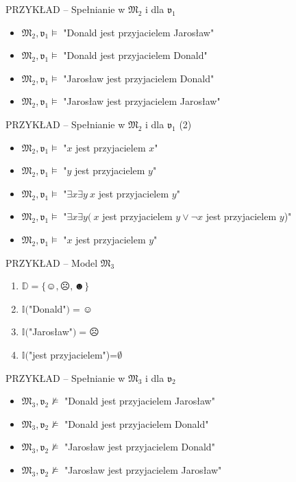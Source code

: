 \documentclass{beamer}
\begin{document}
\begin{frame}{PRZYKŁAD -- Spełnianie w $\mathfrak{M}_2$ i dla $\mathfrak{v}_1$}
%
\begin{itemize}
\item $\mathfrak{M}_2,\mathfrak{v}_1 \vDash$ "Donald jest przyjacielem Jarosław"%
\item $\mathfrak{M}_2,\mathfrak{v}_1 \vDash$ "Donald jest przyjacielem Donald"%
\item $\mathfrak{M}_2,\mathfrak{v}_1 \vDash$ "Jarosław jest przyjacielem Donald"%
\item $\mathfrak{M}_2,\mathfrak{v}_1 \vDash$ "Jarosław jest przyjacielem Jarosław"
\end{itemize}
\end{frame}

\begin{frame}{PRZYKŁAD -- Spełnianie w $\mathfrak{M}_2$ i dla $\mathfrak{v}_1$ (2)}
%
\begin{itemize}
\item $\mathfrak{M}_2,\mathfrak{v}_1 \vDash$ "$x$ jest przyjacielem $x$"%
\item $\mathfrak{M}_2,\mathfrak{v}_1 \vDash$ "$y$ jest przyjacielem $y$"%
\item $\mathfrak{M}_2,\mathfrak{v}_1 \vDash$ "$\exists x \exists y ~x$ jest przyjacielem $y$"%
\item $\mathfrak{M}_2,\mathfrak{v}_1 \vDash$ "$\exists x \exists y ( ~x$ jest przyjacielem $y \lor \neg x$ jest przyjacielem $y$)"%
\item $\mathfrak{M}_2,\mathfrak{v}_1 \vDash$ "$x$ jest przyjacielem $y$"
\end{itemize}
\end{frame}

\begin{frame}{PRZYKŁAD -- Model $\mathfrak{M}_3$}
%
\begin{enumerate}
    \item $\mathbb{D} = \{\smiley{}, \frownie{}, \blacksmiley{} \}$%
    \item $\mathbb{I}($"Donald"$)=\smiley{}$%
    \item $\mathbb{I}($"Jarosław"$)=\frownie{}$%
    \item $\mathbb{I}($"jest przyjacielem")=$\emptyset$
\end{enumerate}
\end{frame}


\begin{frame}{PRZYKŁAD -- Spełnianie w $\mathfrak{M}_3$ i dla $\mathfrak{v}_2$}
%
\begin{itemize}
\item $\mathfrak{M}_3,\mathfrak{v}_2 \not \vDash$ "Donald jest przyjacielem Jarosław"%
\item $\mathfrak{M}_3,\mathfrak{v}_2 \not \vDash$ "Donald jest przyjacielem Donald"%
\item $\mathfrak{M}_3,\mathfrak{v}_2 \not \vDash$ "Jarosław jest przyjacielem Donald"%
\item $\mathfrak{M}_3,\mathfrak{v}_2 \not \vDash$ "Jarosław jest przyjacielem Jarosław"
\end{itemize}
\end{frame}
\end{document}

